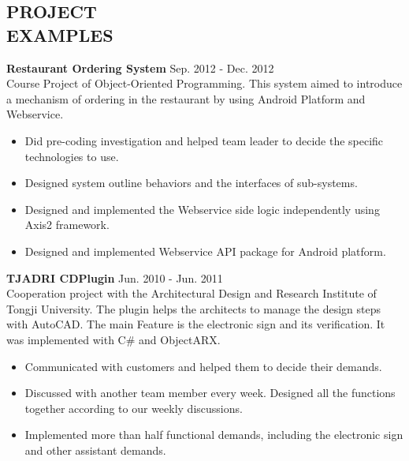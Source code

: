 \documentclass[margin]{res}
\begin{document}
\begin{resume}
\section{PROJECT \\ EXAMPLES}
{\bf Restaurant Ordering System} \hfill Sep. 2012 - Dec. 2012 \\
Course Project of Object-Oriented Programming. This system aimed to introduce a mechanism of ordering in the restaurant by using Android Platform and Webservice.
\begin{itemize}
\item Did pre-coding investigation and helped team leader to decide the specific technologies to use.
\item Designed system outline behaviors and the interfaces of sub-systems.
\item Designed and implemented the Webservice side logic independently using Axis2 framework.
\item Designed and implemented Webservice API package for Android platform.
\end{itemize}
{\bf TJADRI CDPlugin} \hfill Jun. 2010 - Jun. 2011 \\
Cooperation project with the Architectural Design and Research Institute of Tongji University. The plugin helps the architects to manage the design steps with AutoCAD. The main Feature is the electronic sign and its verification. It was implemented with C\# and ObjectARX.
\begin{itemize}
\item Communicated with customers and helped them to decide their demands.
\item Discussed with another team member every week. Designed all the functions together according to our weekly discussions.
\item Implemented more than half functional demands, including the electronic sign and other assistant demands.
\end{itemize}


\end{resume}
\end{document}
